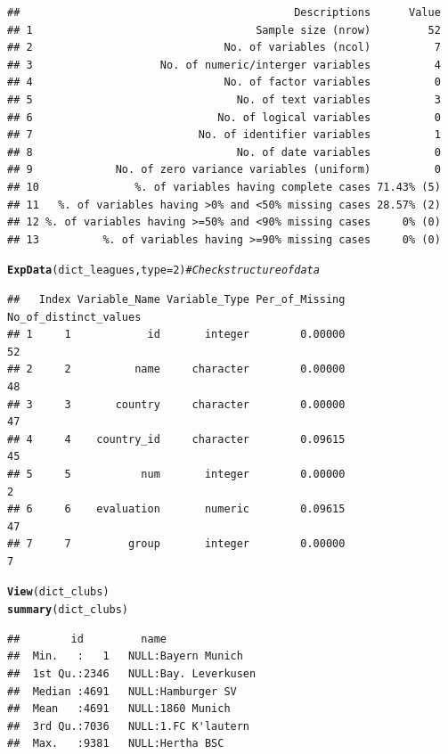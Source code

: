 \documentclass{article}\usepackage[]{graphicx}\usepackage[]{color}
\makeatletter
\newcommand{\hlnum}[1]{\textcolor[rgb]{0.686,0.059,0.569}{#1}}%
\newcommand{\hlcom}[1]{\textcolor[rgb]{0.678,0.584,0.686}{\textit{#1}}}%
\newcommand{\hlstd}[1]{\textcolor[rgb]{0.345,0.345,0.345}{#1}}%
\newcommand{\hlkwc}[1]{\textcolor[rgb]{0.333,0.667,0.333}{#1}}%
\newcommand{\hlkwd}[1]{\textcolor[rgb]{0.737,0.353,0.396}{\textbf{#1}}}%
\newenvironment{kframe}{%
 \def\at@end@of@kframe{}%
 \ifinner\ifhmode%
  \def\at@end@of@kframe{\end{minipage}}%
  \begin{minipage}{\columnwidth}%
 \fi\fi%
 \def\FrameCommand##1{\hskip\@totalleftmargin \hskip-\fboxsep
 \colorbox{shadecolor}{##1}\hskip-\fboxsep
     \hskip-\linewidth \hskip-\@totalleftmargin \hskip\columnwidth}%
 \MakeFramed {\advance\hsize-\width
   \@totalleftmargin\z@ \linewidth\hsize
   \@setminipage}}%
 {\par\unskip\endMakeFramed%
 \at@end@of@kframe}
\newenvironment{knitrout}{}{} %
\makeatother
\begin{document}
\begin{knitrout}
\begin{kframe}
\begin{verbatim}
##                                           Descriptions      Value
## 1                                   Sample size (nrow)         52
## 2                              No. of variables (ncol)          7
## 3                    No. of numeric/interger variables          4
## 4                              No. of factor variables          0
## 5                                No. of text variables          3
## 6                             No. of logical variables          0
## 7                          No. of identifier variables          1
## 8                                No. of date variables          0
## 9             No. of zero variance variables (uniform)          0
## 10               %. of variables having complete cases 71.43% (5)
## 11   %. of variables having >0% and <50% missing cases 28.57% (2)
## 12 %. of variables having >=50% and <90% missing cases     0% (0)
## 13          %. of variables having >=90% missing cases     0% (0)
\end{verbatim}
\begin{alltt}
\hlkwd{ExpData}\hlstd{(dict_leagues,} \hlkwc{type}\hlstd{=}\hlnum{2}\hlstd{)} \hlcom{# Check structure of data}
\end{alltt}
\begin{verbatim}
##   Index Variable_Name Variable_Type Per_of_Missing No_of_distinct_values
## 1     1            id       integer        0.00000                    52
## 2     2          name     character        0.00000                    48
## 3     3       country     character        0.00000                    47
## 4     4    country_id     character        0.09615                    45
## 5     5           num       integer        0.00000                     2
## 6     6    evaluation       numeric        0.09615                    47
## 7     7         group       integer        0.00000                     7
\end{verbatim}
\begin{alltt}
\hlkwd{View}\hlstd{(dict_clubs)}
\hlkwd{summary}\hlstd{(dict_clubs)}
\end{alltt}
\begin{verbatim}
##        id         name                                         
##  Min.   :   1   NULL:Bayern Munich                             
##  1st Qu.:2346   NULL:Bay. Leverkusen                           
##  Median :4691   NULL:Hamburger SV                              
##  Mean   :4691   NULL:1860 Munich                               
##  3rd Qu.:7036   NULL:1.FC K'lautern                            
##  Max.   :9381   NULL:Hertha BSC                                

\end{verbatim}
\end{kframe}
\end{knitrout}
\end{document}
